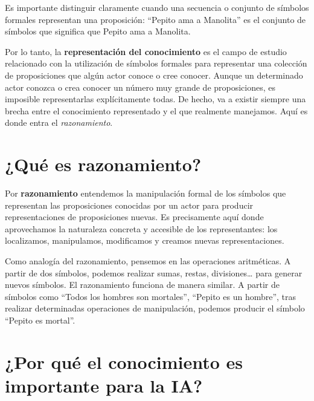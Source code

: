 \documentclass{tufte-handout}
\begin{document}
Es
importante distinguir claramente cuando una secuencia o conjunto de
símbolos formales representan una proposición: ``Pepito ama a Manolita''
es el conjunto de símbolos que significa que Pepito ama a Manolita.

Por lo tanto, la \textbf{representación del conocimiento} es el campo de
estudio relacionado con la utilización de símbolos formales para
representar una colección de proposiciones que algún actor conoce o cree
conocer. Aunque un determinado actor conozca o crea conocer un número
muy grande de proposiciones, es imposible representarlas explícitamente
todas. De hecho, va a existir siempre una brecha entre el conocimiento
representado y el que realmente manejamos. Aquí es donde entra el
\emph{razonamiento}.

\section{¿Qué es razonamiento?}\label{que-es-razonamiento}

Por \textbf{razonamiento} entendemos la manipulación formal de los
símbolos que representan las proposiciones conocidas por un actor para
producir representaciones de proposiciones nuevas. Es precisamente aquí
donde aprovechamos la naturaleza concreta y accesible de los
representantes: los localizamos, manipulamos, modificamos y creamos
nuevas representaciones.

Como analogía del
razonamiento,
pensemos en las operaciones aritméticas. A partir de dos símbolos,
podemos realizar sumas, restas, divisiones\ldots{} para generar nuevos
símbolos. El razonamiento funciona de manera similar. A partir de
símbolos como ``Todos los hombres son mortales'', ``Pepito es un
hombre'', tras realizar determinadas operaciones de manipulación,
podemos producir el símbolo ``Pepito es mortal''.

\section{¿Por qué el conocimiento es importante para la
IA?}\label{por-que-el-conocimiento-es-importante-para-la-ia}
\end{document}
